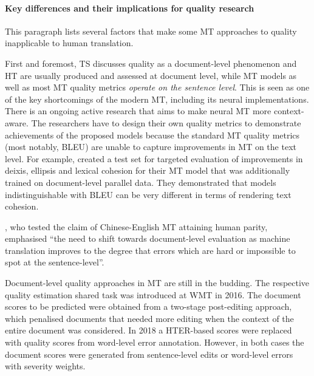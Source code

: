 \paragraph{\label{par:diffs}Key differences and their implications for quality research} %
This paragraph lists several factors that make some MT approaches to quality inapplicable to human translation. 

First and foremost, TS discusses quality as a document-level phenomenon and HT are usually produced and assessed at document level, while MT models as well as most MT quality metrics \textit{operate on the sentence level}.
This is seen as one of the key shortcomings of the modern MT, including its neural implementations. There is an ongoing active research that aims to make neural MT more context-aware. The researchers have to design their own quality metrics to demonstrate achievements of the proposed models because the standard MT quality metrics (most notably, \gls{BLEU}) are unable to capture improvements in MT on the text level. For example, \citet{Voita2019} created a test set for targeted evaluation of improvements in deixis, ellipsis and lexical cohesion for their MT model that was additionally trained on document-level parallel data. They demonstrated that models indistinguishable with BLEU can be very different in terms of rendering text cohesion.

\citet[p.4791]{Laubli2018}, who tested the claim of Chinese-English MT attaining human parity, emphasised ``the need to shift towards document-level evaluation as machine translation improves to the degree that errors which are hard or impossible to spot at the sentence-level''. 

Document-level quality approaches in MT are still in the budding. The respective quality estimation shared task was introduced at \gls{WMT} in 2016. The document scores to be predicted were obtained from a two-stage post-editing approach, which penalised documents that needed more editing when the context of the entire document was considered. 
In 2018 a HTER-based scores were replaced with quality scores from word-level error annotation. However, in both cases the document scores were generated from sentence-level edits or word-level errors with severity weights.
 
